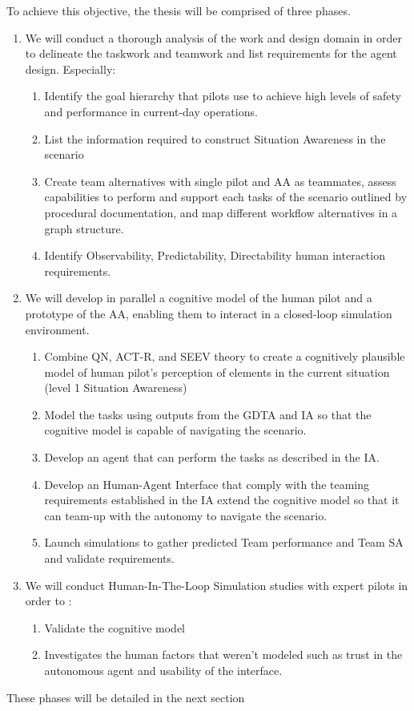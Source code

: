 \documentclass[12pt,a4paper]{article} %
\begin{document}
	To achieve this objective, the thesis will be comprised of three phases.
	\begin{enumerate}[label=\textbf{Phase \arabic*.}]
		\item We will conduct a thorough analysis of the work and design domain in order to delineate the taskwork and teamwork and list requirements for the agent design. Especially:
		\begin{enumerate}[label=\textbf{\arabic{enumi}.\Alph*.}]
			\item \label{obj:1a} Identify the goal hierarchy that pilots use to achieve high levels of safety and performance in current-day operations.
			\item \label{obj:1b} List the information required to construct Situation Awareness in the scenario
			\item \label{obj:1c} Create team alternatives with single pilot and AA as teammates, assess capabilities to perform and support each tasks of the scenario outlined by procedural documentation, and map different workflow alternatives in a graph structure.
			\item \label{obj:1d} Identify Observability, Predictability, Directability human interaction requirements.
		\end{enumerate}
		\item We will develop in parallel a cognitive model of the human pilot and a prototype of the AA, enabling them to interact in a closed-loop simulation environment. 
		\begin{enumerate}[label=\textbf{\arabic{enumi}.\Alph*.}]
			\item \label{obj:2a} Combine QN, ACT-R, and SEEV theory to create a cognitively plausible model of human pilot's perception of elements in the current situation (level 1 Situation Awareness)
			\item \label{obj:2b} Model the tasks using outputs from the GDTA and IA so that the cognitive model is capable of navigating the scenario.
			\item \label{obj:2c} Develop an agent that can perform the tasks as described in the IA.
			\item \label{obj:2d} Develop an Human-Agent Interface that comply with the teaming requirements established in the IA extend the cognitive model so that it can team-up with the autonomy to navigate the scenario.
			\item \label{obj:2e} Launch simulations to gather predicted Team performance and Team SA and validate requirements.
		\end{enumerate}
		\item We will conduct Human-In-The-Loop Simulation studies with expert pilots in order to :
		\begin{enumerate}[label=\textbf{\arabic{enumi}.\Alph*.}]
			\item \label{obj:3a} Validate the cognitive model
			\item \label{obj:3b} Investigates the human factors that weren't modeled such as trust in the autonomous agent and usability of the interface.
		\end{enumerate}
	\end{enumerate}
	These phases will be detailed in the next section 
	
\end{document}
